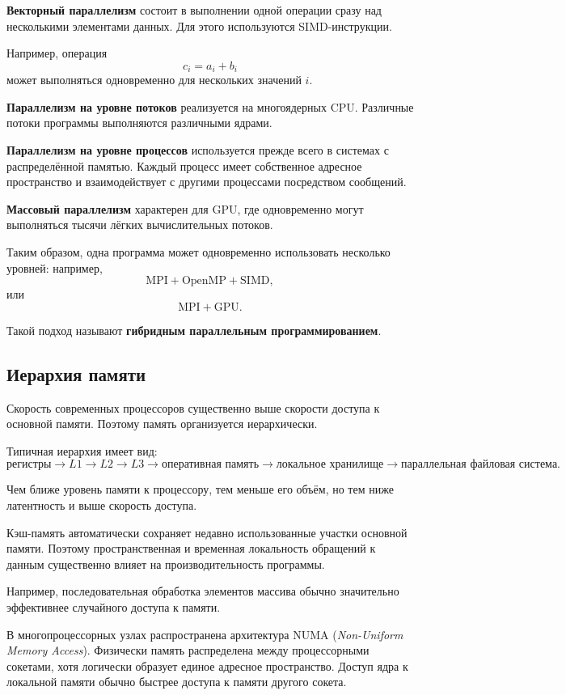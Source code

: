 \textbf{Векторный параллелизм} состоит в выполнении одной операции сразу
над несколькими элементами данных. Для этого используются SIMD-инструкции.

Например, операция
\[
c_i = a_i + b_i
\]
может выполняться одновременно для нескольких значений $i$.

\textbf{Параллелизм на уровне потоков} реализуется на многоядерных CPU.
Различные потоки программы выполняются различными ядрами.

\textbf{Параллелизм на уровне процессов} используется прежде всего
в системах с распределённой памятью. Каждый процесс имеет собственное адресное
пространство и взаимодействует с другими процессами посредством сообщений.

\textbf{Массовый параллелизм} характерен для GPU, где одновременно могут
выполняться тысячи лёгких вычислительных потоков.

Таким образом, одна программа может одновременно использовать несколько уровней:
например,
\[
\text{MPI} + \text{OpenMP} + \text{SIMD},
\]
или
\[
\text{MPI} + \text{GPU}.
\]

Такой подход называют \textbf{гибридным параллельным программированием}.

\subsection{Иерархия памяти}

Скорость современных процессоров существенно выше скорости доступа
к основной памяти. Поэтому память организуется иерархически.

Типичная иерархия имеет вид:
\[
\text{регистры}
\rightarrow
L1
\rightarrow
L2
\rightarrow
L3
\rightarrow
\text{оперативная память}
\rightarrow
\text{локальное хранилище}
\rightarrow
\text{параллельная файловая система}.
\]

Чем ближе уровень памяти к процессору, тем меньше его объём, но тем ниже
латентность и выше скорость доступа.

Кэш-память автоматически сохраняет недавно использованные участки основной
памяти. Поэтому пространственная и временная локальность обращений к данным
существенно влияет на производительность программы.

Например, последовательная обработка элементов массива обычно значительно
эффективнее случайного доступа к памяти.

В многопроцессорных узлах распространена архитектура NUMA
(\textit{Non-Uniform Memory Access}). Физически память распределена между
процессорными сокетами, хотя логически образует единое адресное пространство.
Доступ ядра к локальной памяти обычно быстрее доступа к памяти другого сокета.

